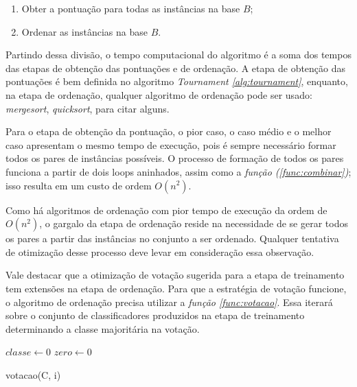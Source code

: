 \begin{enumerate}
    \item Obter a pontuação para todas as instâncias na base $B$;
    \item Ordenar as instâncias na base $B$.
\end{enumerate}

Partindo dessa divisão, o tempo computacional do algoritmo é a soma dos tempos das etapas de obtenção das pontuações e de ordenação. A etapa de obtenção das pontuações é bem definida no algoritmo \emph{Tournament \ref{alg:tournament}}, enquanto, na etapa de ordenação, qualquer algoritmo de ordenação pode ser usado: \emph{mergesort}, \emph{quicksort}, para citar alguns.

Para o etapa de obtenção da pontuação, o pior caso, o caso médio e o melhor caso apresentam o mesmo tempo de execução, pois é sempre necessário formar todos os pares de instâncias possíveis. O processo de formação de todos os pares funciona a partir de dois loops aninhados, assim como a \emph{função (\ref{func:combinar})}; isso resulta em um custo de ordem $O(n^2)$.

Como há algoritmos de ordenação com pior tempo de execução da ordem de $O(n^2)$, o gargalo da etapa de ordenação reside na necessidade de se gerar todos os pares a partir das instâncias no conjunto a ser ordenado. Qualquer tentativa de otimização desse processo deve levar em consideração essa observação.

Vale destacar que a otimização de votação sugerida para a etapa de treinamento tem extensões na etapa de ordenação. Para que a estratégia de votação funcione, o algoritmo de ordenação precisa utilizar a \emph{função \ref{func:votacao}}. Essa iterará sobre o conjunto de classificadores produzidos na etapa de treinamento determinando a classe majoritária na votação.

\begin{function}[H]

    $classe \gets 0$\;
    $zero \gets 0$




    \caption{votacao(C, i)}
    \label{func:votacao}
\end{function}

